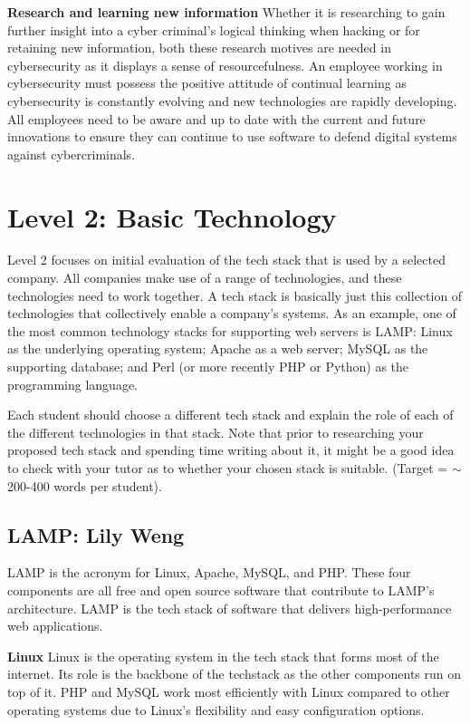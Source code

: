 \documentclass[a4paper, 11pt]{report}
\begin{document}
\textbf{Research and learning new information}
Whether it is researching to gain further insight into a cyber criminal’s logical thinking when hacking or for retaining new information, both these research motives are needed in cybersecurity as it displays a sense of resourcefulness. An employee working in cybersecurity must possess the positive attitude of continual learning as cybersecurity is constantly evolving and new technologies are rapidly developing. All employees need to be aware and up to date with the current and future innovations to ensure they can continue to use software to defend digital systems against cybercriminals.



\newpage
\section{Level 2: Basic Technology}

Level 2 focuses on initial evaluation of the tech stack that is used by a selected company. All companies make use of a range of technologies, and these technologies need to work together. A tech stack is basically just this collection of technologies that collectively enable a company's systems. As an example, one of the most common technology stacks for supporting web servers is LAMP: Linux as the underlying operating system; Apache as a web server; MySQL as the supporting database; and Perl (or more recently PHP or Python) as the programming language.

Each student should choose a different tech stack and explain the role of each of the different technologies in that stack. Note that prior to researching your proposed tech stack and spending time writing about it, it might be a good idea to check with your tutor as to whether your chosen stack is suitable. (Target = $\sim$200-400 words per student).

\subsection{LAMP: Lily Weng}

LAMP is the acronym for Linux, Apache, MySQL, and PHP.  These four components are all free and open source software that contribute to LAMP’s architecture. LAMP is the tech stack of software that delivers high-performance web applications.

\textbf{Linux}
Linux is the operating system in the tech stack that forms most of the internet. Its role is the backbone of the techstack as the other components run on top of it. PHP and MySQL work most efficiently with Linux compared to other operating systems due to Linux’s flexibility and easy configuration options. 
\end{document}
